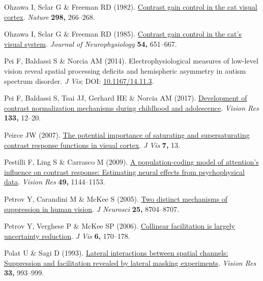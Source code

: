 \documentclass[
  letterpaper,
  DIV=11,
  numbers=noendperiod]{scrartcl}
\newlength{\cslhangindent}
\newenvironment{CSLReferences}[2] %
 {\begin{list}{}{%
  \setlength{\itemindent}{0pt}
  \setlength{\leftmargin}{0pt}
  \setlength{\parsep}{0pt}
  \ifodd #1
   \setlength{\leftmargin}{\cslhangindent}
   \setlength{\itemindent}{-1\cslhangindent}
  \fi
  \setlength{\itemsep}{#2\baselineskip}}}
 {\end{list}}
\begin{document}
\begin{CSLReferences}{1}{1}
Ohzawa I, Sclar G \& Freeman RD (1982).
\href{https://doi.org/10.1038/298266a0}{Contrast gain control in the cat
visual cortex}. \emph{Nature} \textbf{298,} 266--268.

Ohzawa I, Sclar G \& Freeman RD (1985).
\href{https://doi.org/10.1152/jn.1985.54.3.651}{Contrast gain control in
the cat's visual system}. \emph{Journal of Neurophysiology} \textbf{54,}
651--667.

Pei F, Baldassi S \& Norcia AM (2014). Electrophysiological measures of
low-level vision reveal spatial processing deficits and hemispheric
asymmetry in autism spectrum disorder. \emph{J Vis}; DOI:
\href{https://doi.org/10.1167/14.11.3}{10.1167/14.11.3}.

Pei F, Baldassi S, Tsai JJ, Gerhard HE \& Norcia AM (2017).
\href{https://doi.org/10.1016/j.visres.2016.03.010}{Development of
contrast normalization mechanisms during childhood and adolescence}.
\emph{Vision Res} \textbf{133,} 12--20.

Peirce JW (2007). \href{https://doi.org/10.1167/7.6.13}{The potential
importance of saturating and supersaturating contrast response functions
in visual cortex}. \emph{J Vis} \textbf{7,} 13.

Pestilli F, Ling S \& Carrasco M (2009).
\href{https://doi.org/10.1016/j.visres.2008.09.018}{A population-coding
model of attention's influence on contrast response: Estimating neural
effects from psychophysical data}. \emph{Vision Res} \textbf{49,}
1144--1153.

Petrov Y, Carandini M \& McKee S (2005).
\href{https://doi.org/10.1523/JNEUROSCI.2871-05.2005}{Two distinct
mechanisms of suppression in human vision}. \emph{J Neurosci}
\textbf{25,} 8704--8707.

Petrov Y, Verghese P \& McKee SP (2006).
\href{https://doi.org/10.1167/6.2.8}{Collinear facilitation is largely
uncertainty reduction}. \emph{J Vis} \textbf{6,} 170--178.

Polat U \& Sagi D (1993).
\href{https://doi.org/10.1016/0042-6989(93)90081-7}{Lateral interactions
between spatial channels: Suppression and facilitation revealed by
lateral masking experiments}. \emph{Vision Res} \textbf{33,} 993--999.


\end{CSLReferences}
\end{document}
